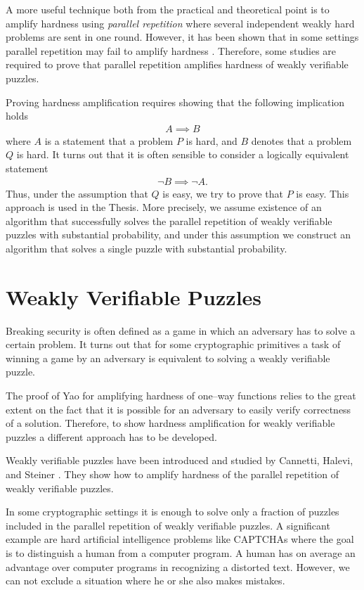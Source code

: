 \documentclass[11pt,a4paper,titlepage]{memoir}
\begin{document}
A more useful technique both from the practical and theoretical point is to amplify hardness using \textit{parallel repetition}
where several independent weakly hard problems are sent in one round.
However, it has been shown that in some settings parallel repetition may fail to amplify hardness \cite{bellare1997does}.
Therefore, some studies are required to prove that parallel repetition amplifies hardness
of weakly verifiable puzzles.

Proving hardness amplification requires showing that the following implication holds
\begin{align*}
  A \implies B
\end{align*}
where $A$ is a statement that a problem $P$ is hard, and $B$ denotes that a problem $Q$ is hard.
It turns out that it is often sensible to consider a logically equivalent statement
\begin{align*}
  \lnot B \implies \lnot A.
\end{align*}
Thus, under the assumption that $Q$ is easy, we try to prove that $P$ is easy.
This approach is used in the Thesis. More precisely, we assume existence of an algorithm that successfully
solves the parallel repetition of weakly verifiable puzzles with substantial probability, and
under this assumption we construct an algorithm that solves a single puzzle with substantial probability.

\section{Weakly Verifiable Puzzles}
Breaking security is often defined as a game in which an adversary has to solve a certain problem.
It turns out that for some cryptographic primitives a task of winning a game by an adversary
is equivalent to solving a weakly verifiable puzzle.

The proof of Yao for amplifying hardness of one--way functions relies to the great extent on the fact that it is possible
for an adversary to easily verify correctness of a solution. Therefore, to show hardness amplification
for weakly verifiable puzzles a different approach has to be developed.

Weakly verifiable puzzles have been introduced and studied by Cannetti, Halevi, and Steiner \cite{canetti2004hardness}.
They show how to amplify hardness of the parallel repetition of weakly verifiable puzzles.

In some cryptographic settings it is enough to solve only a fraction of puzzles included in the parallel repetition of weakly verifiable puzzles.
A significant example are hard artificial intelligence problems like CAPTCHAs where the goal is to distinguish a human from a computer program.
A human has on average an advantage over computer programs in recognizing a distorted text. However, we can not exclude a situation where he or she also makes mistakes.
\end{document}
